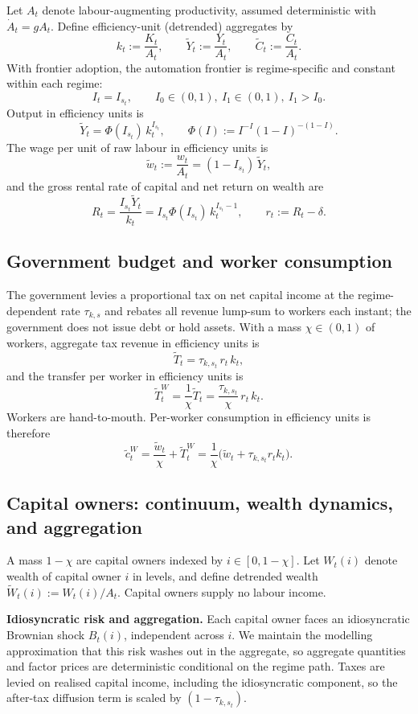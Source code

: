 \documentclass{article}
\begin{document}
Let $A_t$ denote labour-augmenting productivity, assumed deterministic with $\dot A_t=gA_t$. Define efficiency-unit
(detrended) aggregates by
\[
k_t := \frac{K_t}{A_t},
\qquad
\tilde Y_t := \frac{Y_t}{A_t},
\qquad
\tilde C_t := \frac{C_t}{A_t}.
\]
With frontier adoption, the automation frontier is regime-specific and constant within each regime:
\[
I_t = I_{s_t},
\qquad
I_0\in(0,1),\ I_1\in(0,1),\ I_1>I_0.
\]
Output in efficiency units is
\[
\tilde Y_t = \Phi(I_{s_t})\, k_t^{I_{s_t}},
\qquad
\Phi(I):=I^{-I}(1-I)^{-(1-I)}.
\]
The wage per unit of raw labour in efficiency units is
\[
\tilde w_t := \frac{w_t}{A_t} = (1-I_{s_t})\,\tilde Y_t,
\]
and the gross rental rate of capital and net return on wealth are
\[
R_t = \frac{I_{s_t}\tilde Y_t}{k_t} = I_{s_t}\Phi(I_{s_t})\,k_t^{I_{s_t}-1},
\qquad
r_t := R_t-\delta.
\]

\subsection{Government budget and worker consumption}

The government levies a proportional tax on net capital income at the regime-dependent rate $\tau_{k,s}$ and rebates
all revenue lump-sum to workers each instant; the government does not issue debt or hold assets. With a mass
$\chi\in(0,1)$ of workers, aggregate tax revenue in efficiency units is
\[
\tilde T_t = \tau_{k,s_t}\, r_t\, k_t,
\]
and the transfer per worker in efficiency units is
\[
\tilde T^W_t = \frac{1}{\chi}\tilde T_t = \frac{\tau_{k,s_t}}{\chi}\, r_t\, k_t.
\]
Workers are hand-to-mouth. Per-worker consumption in efficiency units is therefore
\[
\tilde c^W_t = \frac{\tilde w_t}{\chi} + \tilde T^W_t
= \frac{1}{\chi}\Big(\tilde w_t + \tau_{k,s_t} r_t k_t\Big).
\]

\subsection{Capital owners: continuum, wealth dynamics, and aggregation}

A mass $1-\chi$ are capital owners indexed by $i\in[0,1-\chi]$. Let $W_t(i)$ denote wealth of capital owner $i$ in levels,
and define detrended wealth $\tilde W_t(i):=W_t(i)/A_t$. Capital owners supply no labour income.

\medskip
\noindent
\textbf{Idiosyncratic risk and aggregation.}
Each capital owner faces an idiosyncratic Brownian shock $B_t(i)$, independent across $i$. We maintain the modelling
approximation that this risk washes out in the aggregate, so aggregate quantities and factor prices are deterministic
conditional on the regime path. Taxes are levied on realised capital income, including the idiosyncratic component,
so the after-tax diffusion term is scaled by $(1-\tau_{k,s_t})$.
\end{document}
